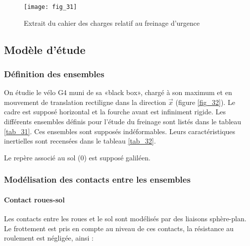 \begin{figure}[!h]
\centering
\texttt{[image: fig\_31]}
\caption{\label{fig_3_cargo}Extrait du cahier des charges relatif au freinage d'urgence}
\end{figure}



\subsection{Modèle d'étude}
\subsubsection{Définition des ensembles}
On étudie le vélo G4 muni de sa «black box», chargé à son maximum et en mouvement de translation rectiligne dans la direction \(\vec{x}\) (figure \ref{fig_32}). Le cadre est supposé horizontal et la fourche avant est infiniment rigide. Les différents ensembles définis pour l'étude du freinage sont listés dans le tableau \ref{tab_31}. Ces ensembles sont supposés indéformables. Leurs caractéristiques inertielles sont recensées dans le tableau \ref{tab_32}.

Le repère associé au sol (0) est supposé galiléen.

\subsubsection{Modélisation des contacts entre les ensembles}
\paragraph*{Contact roues-sol} 
Les contacts entre les roues et le sol sont modélisés par des liaisons sphère-plan. Le frottement est pris en compte au niveau de ces contacts, la résistance au roulement est négligée, ainsi :

